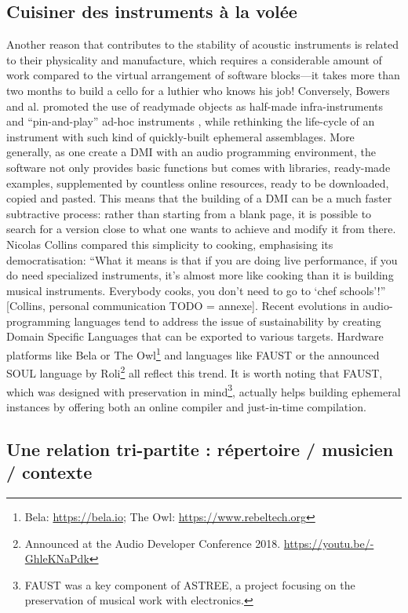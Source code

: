 \subsection{Cuisiner des instruments à la volée}
Another reason that contributes to the stability of acoustic instruments is related to their physicality and manufacture, which requires a considerable amount of work compared to the virtual arrangement of software blocks—it takes more than two months to build a cello for a luthier who knows his job! Conversely, Bowers and al. promoted the use of readymade objects as half-made infra-instruments \cite{bowers_not_2005} and “pin-and-play” ad-hoc instruments \cite{bowers_creating_2006}, while rethinking the life-cycle of an instrument with such kind of quickly-built ephemeral assemblages.
	More generally, as one create a DMI with an audio programming environment, the software not only provides basic functions but comes with libraries, ready-made examples, supplemented by countless online resources, ready to be downloaded, copied and pasted.
	This means that the building of a DMI can be a much faster subtractive process: rather than starting from a blank page, it is possible to search for a version close to what one wants to achieve and modify it from there. Nicolas Collins compared this simplicity to cooking, emphasising its democratisation: “What it means is that if you are doing live performance, if you do need specialized instruments, it's almost more like cooking than it is building musical instruments. Everybody cooks, you don't need to go to ‘chef schools’!” [Collins, personal communication TODO = annexe].
	Recent evolutions in audio-programming languages tend to address the issue of sustainability by creating Domain Specific Languages that can be exported to various targets. Hardware platforms like Bela or The Owl\footnote{Bela: \url{https://bela.io}; The Owl: \url{https://www.rebeltech.org}} and languages like FAUST \cite{orlarey_faust_2008} or the announced SOUL language by Roli\footnote{Announced at the Audio Developer Conference 2018. \url{https://youtu.be/-GhleKNaPdk}} all reflect this trend. It is worth noting that FAUST, which was designed with preservation in mind\footnote{FAUST was a key component of ASTREE, a project focusing on the preservation of musical work with electronics.}, actually helps building ephemeral instances by offering both an online compiler and just-in-time compilation.
	
\subsection{Une relation tri-partite : répertoire / musicien / contexte}

